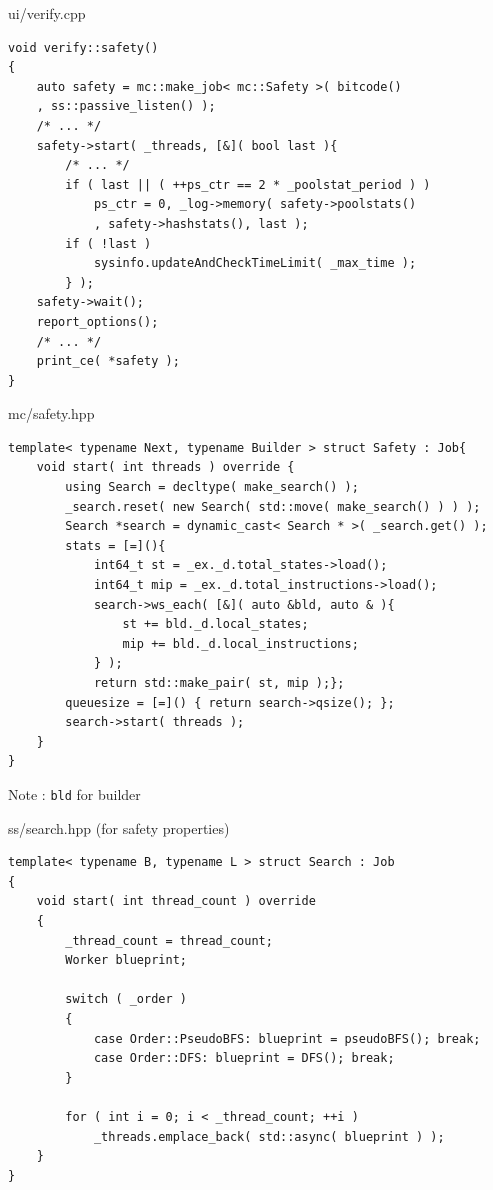 \documentclass[12pt]{beamer}
\newcommand{\code}[1]{\texttt{#1}}
\begin{document}
\begin{frame}[fragile]{ui/verify.cpp}
\begin{lstlisting}[basicstyle=\footnotesize\ttfamily]
void verify::safety()
{
    auto safety = mc::make_job< mc::Safety >( bitcode()
    , ss::passive_listen() );
    /* ... */
    safety->start( _threads, [&]( bool last ){
        /* ... */
        if ( last || ( ++ps_ctr == 2 * _poolstat_period ) )
            ps_ctr = 0, _log->memory( safety->poolstats()
            , safety->hashstats(), last );
        if ( !last )
            sysinfo.updateAndCheckTimeLimit( _max_time );
        } );
    safety->wait();
    report_options();
    /* ... */
    print_ce( *safety );
}
\end{lstlisting}
\end{frame}

\begin{frame}[fragile]{mc/safety.hpp}
\begin{lstlisting}[basicstyle=\footnotesize\ttfamily]
template< typename Next, typename Builder > struct Safety : Job{
    void start( int threads ) override {
        using Search = decltype( make_search() );
        _search.reset( new Search( std::move( make_search() ) ) );
        Search *search = dynamic_cast< Search * >( _search.get() );
        stats = [=](){
            int64_t st = _ex._d.total_states->load();
            int64_t mip = _ex._d.total_instructions->load();
            search->ws_each( [&]( auto &bld, auto & ){
                st += bld._d.local_states;
                mip += bld._d.local_instructions;
            } );
            return std::make_pair( st, mip );};
        queuesize = [=]() { return search->qsize(); };
        search->start( threads );
    }
}
\end{lstlisting}
Note : \code{bld} for builder
\end{frame}

\begin{frame}[fragile]{ss/search.hpp (for safety properties)}
\begin{lstlisting}[basicstyle=\footnotesize\ttfamily]
template< typename B, typename L > struct Search : Job
{
    void start( int thread_count ) override
    {
        _thread_count = thread_count;
        Worker blueprint;

        switch ( _order )
        {
            case Order::PseudoBFS: blueprint = pseudoBFS(); break;
            case Order::DFS: blueprint = DFS(); break;
        }

        for ( int i = 0; i < _thread_count; ++i )
            _threads.emplace_back( std::async( blueprint ) );
    }
}
\end{lstlisting}
\end{frame}
\end{document}
